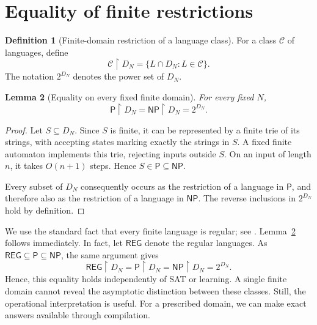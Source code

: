 \documentclass[11pt,a4paper]{article}
\numberwithin{equation}{section}
\newcommand{\Pclass}{\mathsf{P}}
\newcommand{\NPclass}{\mathsf{NP}}
\newcommand{\restr}{\mathbin{\upharpoonright}}
\theoremstyle{plain}
\newtheorem{lemma}{Lemma}[section]
\theoremstyle{definition}
\newtheorem{definition}[lemma]{Definition}
\theoremstyle{remark}
\begin{document}
\FloatBarrier
\section{Equality of finite restrictions}
\label{sec:restriction}

\begin{definition}[Finite-domain restriction of a language class]
For a class $\mathcal C$ of languages, define
\begin{equation}
\mathcal C\restr D_N=\{L\cap D_N:L\in\mathcal C\}.
\end{equation}
The notation $2^{D_N}$ denotes the power set of $D_N$.
\end{definition}

\begin{lemma}[Equality on every fixed finite domain]
\label{lem:restriction}
For every fixed $N$,
\begin{equation}
\boxed{\Pclass\restr D_N=\NPclass\restr D_N=2^{D_N}.}
\label{eq:finite-equality}
\end{equation}
\end{lemma}

\begin{proof}
Let $S\subseteq D_N$. Since $S$ is finite, it can be represented by a finite trie of its strings, with accepting states marking exactly the strings in $S$. A fixed finite automaton implements this trie, rejecting inputs outside $S$. On an input of length $n$, it takes $O(n+1)$ steps. Hence $S\in\Pclass\subseteq\NPclass$.

Every subset of $D_N$ consequently occurs as the restriction of a language in $\Pclass$, and therefore also as the restriction of a language in $\NPclass$. The reverse inclusions in $2^{D_N}$ hold by definition.
\end{proof}

We use the standard fact that every finite language is regular; see \citet[Remark~1.12, p.~12]{rigo2014}. Lemma~\ref{lem:restriction} follows immediately. In fact, let $\mathsf{REG}$ denote the regular languages. As $\mathsf{REG}\subseteq\Pclass\subseteq\NPclass$, the same argument gives
\begin{equation}
\mathsf{REG}\restr D_N=\Pclass\restr D_N=\NPclass\restr D_N=2^{D_N}.
\end{equation}
Hence, this equality holds independently of SAT or learning. A single finite domain cannot reveal the asymptotic distinction between these classes. Still, the operational interpretation is useful. For a prescribed domain, we can make exact answers available through compilation.
\end{document}

